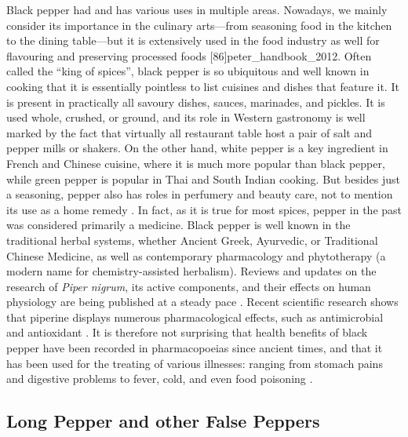 Black pepper had and has various uses in multiple areas. Nowadays, we mainly consider its importance in the culinary arts---from seasoning food in the kitchen to the dining table---but it is extensively used in the food industry as well for flavouring and preserving processed foods [86]{peter_handbook_2012}.
Often called the ``king of spices'', black pepper is so ubiquitous and well known in cooking that it is essentially pointless to list cuisines and dishes that feature it. It is present in practically all savoury dishes, sauces, marinades, and pickles. It is used whole, crushed, or ground, and its role in Western gastronomy is well marked by the fact that virtually all restaurant table host a pair of salt and pepper mills or shakers. On the other hand, white pepper is a key ingredient in French and Chinese cuisine, where it is much more popular than black pepper, while green pepper is popular in Thai and South Indian cooking. 
But besides just a seasoning, pepper also has roles in perfumery and beauty care, not to mention its use as a home remedy \autocite[467]{ravindran_black_2000}. In fact, as it is true for most spices, pepper in the past was considered primarily a medicine. Black pepper is well known in the traditional herbal systems, whether Ancient Greek, Ayurvedic, or Traditional Chinese Medicine, as well as contemporary pharmacology and phytotherapy (a modern name for chemistry-assisted herbalism). Reviews and updates on the research of \textit{Piper nigrum}, its active components, and their effects on human physiology are being published at a steady pace \autocite[see][]{srinivasan_black_2007, butt_black_2013, meghwal_piper_2013, haq_piperine_2021}. Recent scientific research shows that piperine displays numerous pharmacological effects, such as antimicrobial and antioxidant \autocite{haq_piperine_2021}. It is therefore not surprising that health benefits of black pepper have been recorded in pharmacopoeias since ancient times, and that it has been used for the treating of various illnesses: ranging from stomach pains and digestive problems to fever, cold, and even food poisoning \autocite[2952]{quattrocchi_crc_2014}.

\subsection{Long Pepper and other False Peppers}
\label{sec:long_pepper}


